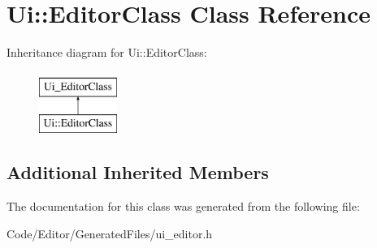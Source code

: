 \hypertarget{class_ui_1_1_editor_class}{}\section{Ui\+:\+:Editor\+Class Class Reference}
\label{class_ui_1_1_editor_class}
Inheritance diagram for Ui\+:\+:Editor\+Class\+:\begin{figure}[H]
\begin{center}
\leavevmode
\includegraphics[height=2.000000cm]{class_ui_1_1_editor_class}
\end{center}
\end{figure}
\subsection*{Additional Inherited Members}


The documentation for this class was generated from the following file\+:\begin{DoxyCompactItemize}
\item 
Code/\+Editor/\+Generated\+Files/ui\+\_\+editor.\+h\end{DoxyCompactItemize}
